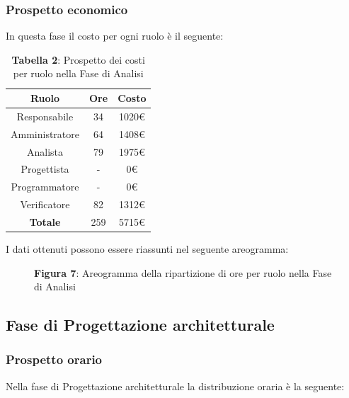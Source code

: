 \subsubsection{Prospetto economico}
In questa fase il costo per ogni ruolo è il seguente:

\begin{table}[H]
	\centering
	\renewcommand{\arraystretch}{1.5}
	\begin{tabular}{|c|c|c|}
		\hline
		\rowcolor{lighter-grayer}
Ruolo & Ore & Costo \\ \hline
Responsabile & 34 & 1020\euro \\ \hline
Amministratore & 64 & 1408\euro \\ \hline
Analista & 79 & 1975\euro \\ \hline
Progettista & - & 0\euro \\ \hline
Programmatore & - & 0\euro \\ \hline
Verificatore & 82 & 1312\euro \\ \hline
\textbf{Totale} & 259 & 5715\euro \\ \hline
\end{tabular}
	\caption*{\textbf{Tabella 2}: Prospetto dei costi per ruolo nella Fase di Analisi\\}
\end{table}
I dati ottenuti possono essere riassunti nel seguente areogramma:
\begin{figure}[H]
	\centering
	\caption*{\textbf{Figura 7}:  Areogramma della ripartizione di ore per ruolo nella Fase di Analisi}
	\label{fig:Figura3}
\end{figure}	



\subsection{Fase di Progettazione architetturale}
\subsubsection{Prospetto orario}
Nella fase di Progettazione architetturale la distribuzione oraria è la seguente:

